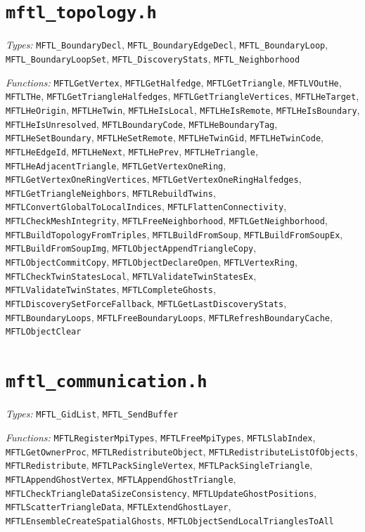 \section*{\texttt{mftl\_topology.h}}
\textit{Types:} \texttt{MFTL\_BoundaryDecl}, \texttt{MFTL\_BoundaryEdgeDecl}, \texttt{MFTL\_BoundaryLoop}, \texttt{MFTL\_BoundaryLoopSet}, \texttt{MFTL\_DiscoveryStats}, \texttt{MFTL\_Neighborhood}\par
\textit{Functions:} \texttt{MFTLGetVertex}, \texttt{MFTLGetHalfedge}, \texttt{MFTLGetTriangle}, \texttt{MFTLVOutHe}, \texttt{MFTLTHe}, \texttt{MFTLGetTriangleHalfedges}, \texttt{MFTLGetTriangleVertices}, \texttt{MFTLHeTarget}, \texttt{MFTLHeOrigin}, \texttt{MFTLHeTwin}, \texttt{MFTLHeIsLocal}, \texttt{MFTLHeIsRemote}, \texttt{MFTLHeIsBoundary}, \texttt{MFTLHeIsUnresolved}, \texttt{MFTLBoundaryCode}, \texttt{MFTLHeBoundaryTag}, \texttt{MFTLHeSetBoundary}, \texttt{MFTLHeSetRemote}, \texttt{MFTLHeTwinGid}, \texttt{MFTLHeTwinCode}, \texttt{MFTLHeEdgeId}, \texttt{MFTLHeNext}, \texttt{MFTLHePrev}, \texttt{MFTLHeTriangle}, \texttt{MFTLHeAdjacentTriangle}, \texttt{MFTLGetVertexOneRing}, \texttt{MFTLGetVertexOneRingVertices}, \texttt{MFTLGetVertexOneRingHalfedges}, \texttt{MFTLGetTriangleNeighbors}, \texttt{MFTLRebuildTwins}, \texttt{MFTLConvertGlobalToLocalIndices}, \texttt{MFTLFlattenConnectivity}, \texttt{MFTLCheckMeshIntegrity}, \texttt{MFTLFreeNeighborhood}, \texttt{MFTLGetNeighborhood}, \texttt{MFTLBuildTopologyFromTriples}, \texttt{MFTLBuildFromSoup}, \texttt{MFTLBuildFromSoupEx}, \texttt{MFTLBuildFromSoupImg}, \texttt{MFTLObjectAppendTriangleCopy}, \texttt{MFTLObjectCommitCopy}, \texttt{MFTLObjectDeclareOpen}, \texttt{MFTLVertexRing}, \texttt{MFTLCheckTwinStatesLocal}, \texttt{MFTLValidateTwinStatesEx}, \texttt{MFTLValidateTwinStates}, \texttt{MFTLCompleteGhosts}, \texttt{MFTLDiscoverySetForceFallback}, \texttt{MFTLGetLastDiscoveryStats}, \texttt{MFTLBoundaryLoops}, \texttt{MFTLFreeBoundaryLoops}, \texttt{MFTLRefreshBoundaryCache}, \texttt{MFTLObjectClear}\par

\section*{\texttt{mftl\_communication.h}}
\textit{Types:} \texttt{MFTL\_GidList}, \texttt{MFTL\_SendBuffer}\par
\textit{Functions:} \texttt{MFTLRegisterMpiTypes}, \texttt{MFTLFreeMpiTypes}, \texttt{MFTLSlabIndex}, \texttt{MFTLGetOwnerProc}, \texttt{MFTLRedistributeObject}, \texttt{MFTLRedistributeListOfObjects}, \texttt{MFTLRedistribute}, \texttt{MFTLPackSingleVertex}, \texttt{MFTLPackSingleTriangle}, \texttt{MFTLAppendGhostVertex}, \texttt{MFTLAppendGhostTriangle}, \texttt{MFTLCheckTriangleDataSizeConsistency}, \texttt{MFTLUpdateGhostPositions}, \texttt{MFTLScatterTriangleData}, \texttt{MFTLExtendGhostLayer}, \texttt{MFTLEnsembleCreateSpatialGhosts}, \texttt{MFTLObjectSendLocalTrianglesToAll}\par

